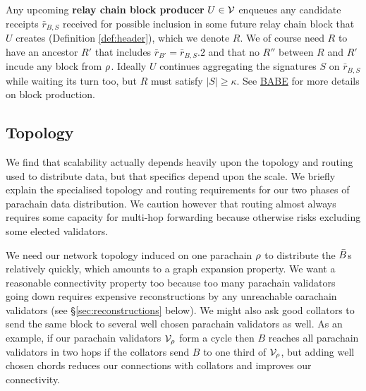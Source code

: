 \smallskip

Any upcoming {\bf relay chain block producer} $U \in \mathcal{V}$ enqueues any candidate receipts $\bar{r}_{B,S}$ received for possible inclusion in some future relay chain block that $U$ creates (Definition \ref{def:header}), which we denote $R$.  We of course need $R$ to have an ancestor $R'$ that includes $\bar{r}_{B'} = \bar{r}_{B,S}.2$ and that no $R''$ between $R$ and $R'$ incude any block from $\rho$.  Ideally $U$ continues aggregating the signatures $S$ on $\bar{r}_{B,S}$ while waiting its turn too, but $R$ must satisfy $|S| \ge \kappa$.  See \href{http://research.web3.foundation/en/latest/polkadot/BABE/Babe/}{BABE} for more details on block production.


\subsection{Topology} 

We find that scalability actually depends heavily upon the topology and routing used to distribute data, but that specifics depend upon the scale.  We briefly explain the specialised topology and routing requirements for our two phases of parachain data distribution.  We caution however that routing almost always requires some capacity for multi-hop forwarding because otherwise risks excluding some elected validators.  

\smallskip

We need our network topology induced on one parachain $\rho$ to distribute the $\bar{B}$s relatively quickly, which amounts to a graph expansion property.  We want a reasonable connectivity property too because too many parachain validators going down requires expensive reconstructions by any unreachable oarachain validators (see \S\ref{sec:reconstructions} below).  We might also ask good collators to send the same block to several well chosen parachain validators as well.  As an example, if our parachain validators $\mathcal{V}_{\rho}$ form a cycle then $B$ reaches all parachain validators in two hops if the collators send $B$ to one third of $\mathcal{V}_{\rho}$, but adding well chosen chords reduces our connections with collators and improves our connectivity.  

